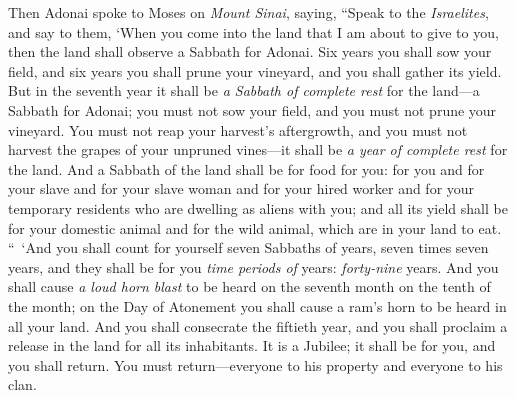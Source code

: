 \begin{biblechapter} %
 Then Adonai spoke to Moses on \textit{Mount Sinai}, saying,
\verse “Speak to the \textit{Israelites}, and say to them, ‘When you come into the land that I am about to give to you, then the land shall observe a Sabbath for Adonai.
\verse Six years you shall sow your field, and six years you shall prune your vineyard, and you shall gather its yield.
\verse But in the seventh year it shall be \textit{a Sabbath of complete rest} for the land—a Sabbath for Adonai; you must not sow your field, and you must not prune your vineyard.
\verse You must not reap your harvest’s aftergrowth, and you must not harvest the grapes of your unpruned vines—it shall be \textit{a year of complete rest} for the land.
\verse And a Sabbath of the land shall be for food for you: for you and for your slave and for your slave woman and for your hired worker and for your temporary residents who are dwelling as aliens with you;
\verse and all its yield shall be for your domestic animal and for the wild animal, which are in your land to eat.
 “ ‘And you shall count for yourself seven Sabbaths of years, seven times seven years, and they shall be for you \textit{time periods of} years: \textit{forty-nine} years.
\verse And you shall cause \textit{a loud horn blast} to be heard on the seventh month on the tenth of the month; on the Day of Atonement you shall cause a ram’s horn to be heard in all your land.
\verse And you shall consecrate the fiftieth year, and you shall proclaim a release in the land for all its inhabitants. It is a Jubilee; it shall be for you, and you shall return. You must return—everyone to his property and everyone to his clan.

\end{biblechapter}
